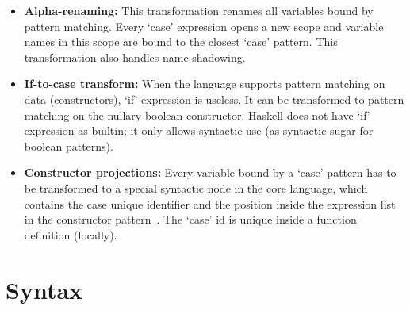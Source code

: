 \documentclass[diploma]{softlab-thesis}
\begin{document}
\begin{itemize}
  \item \textbf{Alpha-renaming:}  This transformation renames all variables bound by pattern matching.
  Every `case' expression opens a new scope and variable names in this scope are bound to the closest 
  `case' pattern. This transformation also handles name shadowing. 
  \item \textbf{If-to-case transform:}  When the language supports pattern matching on data 
  (constructors), `if' expression is useless. It can be transformed to pattern matching on 
  the nullary boolean constructor. Haskell does not have `if' expression as builtin; it only allows
  syntactic use (as syntactic sugar for boolean patterns).
  \item \textbf{Constructor projections:}  Every variable bound by a `case' pattern has to be 
  transformed to a special syntactic node in the core language, which contains the case unique identifier
  and the position inside the expression list in the constructor pattern~\cite{Fourtounis:2013:GIT:2769663.2769674}. The `case' id is 
  unique inside a function definition (locally).
\end{itemize}

\section{Syntax}
\label{sec:syntax}
\end{document}
